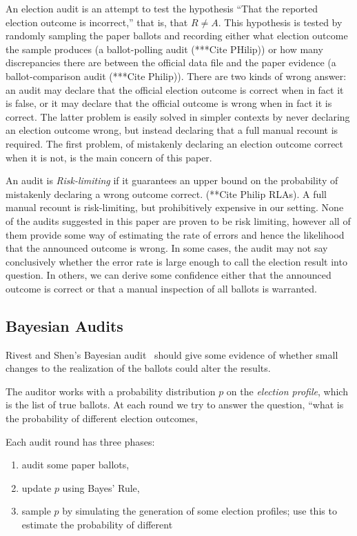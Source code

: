 \documentclass[10pt,a4paper]{article}
\begin{document}
An election audit is an attempt to test the hypothesis ``That the reported election outcome is incorrect,'' that is, that $R \neq A$.  This hypothesis is tested by randomly sampling the paper ballots and recording either what election outcome the sample produces (a ballot-polling audit  (***Cite PHilip)) or how many discrepancies there are between the official data file and the paper evidence (a ballot-comparison audit  (***Cite Philip)). There are two kinds of wrong answer: an audit may declare that the official election outcome is correct when in fact it is false, or it may declare that the official outcome is wrong when in fact it is correct.  The latter problem is easily solved in simpler contexts by never declaring an election outcome wrong, but instead declaring that a full manual recount is required.  The first problem, of mistakenly declaring an election outcome correct when it is not, is the main concern of this paper.

An audit is \emph{Risk-limiting} if it guarantees an upper bound on the probability of mistakenly declaring a wrong outcome correct. (**Cite Philip RLAs).  A full manual recount is risk-limiting, but prohibitively expensive in our setting.  None of the audits suggested in this paper are proven to be risk limiting, however all of them provide some way of estimating the rate of errors and hence the likelihood that the announced outcome is wrong.  In some cases, the audit may not say conclusively whether the error rate is large enough to call the election result into question.  In others, we can derive some confidence either that the announced outcome is correct or that a manual inspection of all ballots is warranted.

\subsection{Bayesian Audits} Rivest and Shen's Bayesian audit~\cite{rivest2012bayesian} should give some evidence of whether small changes to the realization of the ballots could alter the results. 

The auditor works with a probability distribution $p$ on the \emph{election profile}, which is the list of true ballots.  At each round we try to answer the question, ``what is the probability of different election outcomes, 




Each audit round has three phases:
\begin{enumerate}
\item audit some paper ballots,
\item update $p$ using Bayes' Rule,
\item sample $p$ by simulating the generation of some election profiles; use this to estimate the probability of different 
\end{enumerate}
\end{document}

